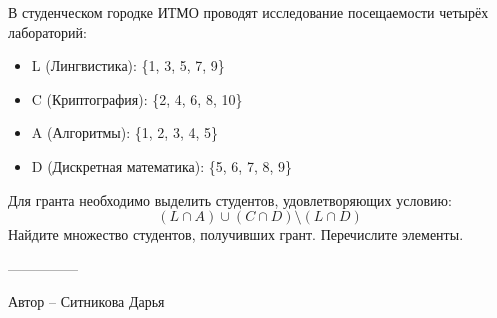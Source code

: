 \question
В студенческом городке ИТМО проводят исследование посещаемости четырёх лабораторий:

\begin{itemize}
    \item L (Лингвистика): \{1, 3, 5, 7, 9\}
    \item C (Криптография): \{2, 4, 6, 8, 10\}
    \item A (Алгоритмы): \{1, 2, 3, 4, 5\}
    \item D (Дискретная математика): \{5, 6, 7, 8, 9\}
\end{itemize}

Для гранта необходимо выделить студентов, удовлетворяющих условию:
$$(L \cap  A) \cup (C \cap D) \setminus (L \cap D)$$
Найдите множество студентов, получивших грант. Перечислите элементы.

---------------

Автор -- Ситникова Дарья